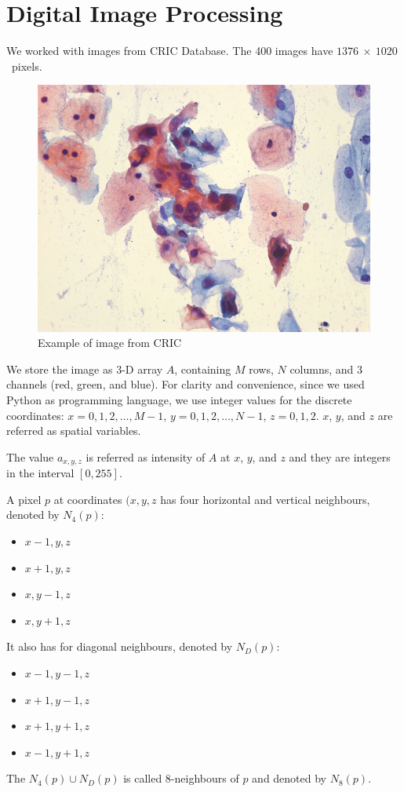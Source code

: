 \chapter{Digital Image Processing}

We worked with images from
CRIC Database.
The 400 images
have \(1376~\times~1020\)~pixels.

\begin{figure}
  \centering
  \includegraphics{R/img/be340ee72689dfe3f8dc9c24de6127f4.png}
  \caption{Example of image from CRIC}
\end{figure}

We store the image as 3-D array \(A\),
containing
\(M\) rows,
\(N\) columns,
and
3 channels
(red, green, and blue).
For clarity
and
convenience,
since we used Python as programming language,
we use integer values for the discrete coordinates:
\(x = 0, 1, 2, \ldots, M - 1\),
\(y = 0, 1, 2, \ldots, N - 1\),
\(z = 0, 1, 2\).
\(x\), \(y\), and \(z\)
are referred as spatial variables.

The value \(a_{x, y, z}\)
is referred as intensity of \(A\)
at \(x\), \(y\), and \(z\)
and they are integers
in the interval
\([0, 255]\).

A pixel \(p\)
at coordinates \((x, y, z\)
has four horizontal and vertical neighbours,
denoted by \(N_4(p)\):
\begin{itemize}
\item \(x - 1, y, z\)
\item \(x + 1, y, z\)
\item \(x, y - 1, z\)
\item \(x, y + 1, z\)
\end{itemize}
It also has for diagonal neighbours,
denoted by \(N_D(p)\):
\begin{itemize}
\item \(x - 1, y - 1, z\)
\item \(x + 1, y - 1, z\)
\item \(x + 1, y + 1, z\)
\item \(x - 1, y + 1, z\)
\end{itemize}
The \(N_4(p) \cup N_D(p)\)
is called 8-neighbours of \(p\)
and denoted by \(N_8(p)\).

